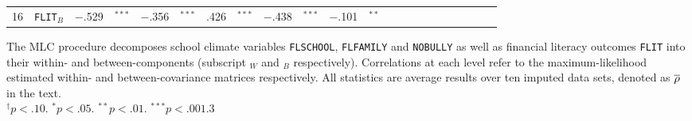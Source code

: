{\begin{tabular}{cl r@{\hskip -0.1mm}l r@{\hskip -0.1mm}l r@{\hskip -0.1mm}l r@{\hskip -0.1mm}l r@{\hskip -0.1mm}l r@{\hskip -0.1mm}l r@{\hskip -0.1mm}l r@{\hskip -0.1mm}l r@{\hskip -0.1mm}l r@{\hskip -0.1mm}l}
            16    & \texttt{FLIT}$_B$  & \cellcolor[rgb]{ 1,  .471,  .471}$-.$529 & $^{***}$ & \cellcolor[rgb]{ 1,  .643,  .643}$-.$356 & $^{***}$ & \cellcolor[rgb]{ .576,  .576,  1}.426 & $^{***}$ & \cellcolor[rgb]{ 1,  .561,  .561}$-.$438 & $^{***}$ & \cellcolor[rgb]{ 1,  .898,  .898}$-.$101 & $^{**}$ &       &       &       &       &       &       &       &       &       &  \\
        \cmidrule[0.08em]{1-14}
      \end{tabular}
}{The MLC procedure decomposes school climate variables \texttt{FLSCHOOL}, \texttt{FLFAMILY} and \texttt{NOBULLY} as well as financial literacy outcomes \texttt{FLIT} into their within- and between-components (subscript $_W$ and $_B$ respectively). Correlations at each level refer to the maximum-likelihood estimated within- and between-covariance matrices respectively. All statistics are average results over ten imputed data sets, denoted as $\overline{\rho}$ in the text.\\
$^\dagger p < .10$. $^* p < .05$. $^{**} p < .01$. $^{***} p < .001$.}{3}
